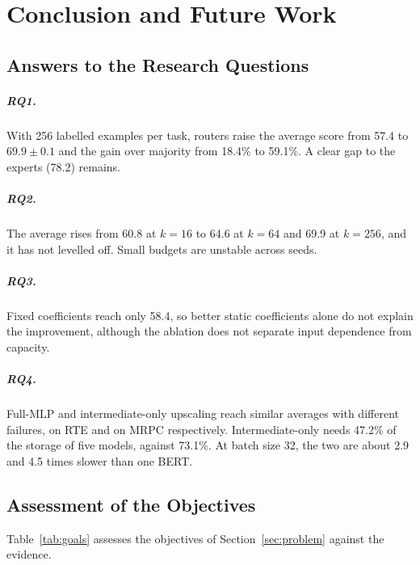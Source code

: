 \chapter{Conclusion and Future Work}
\label{ch:conclusion}

\section{Answers to the Research Questions}

\paragraph{RQ1.} With 256 labelled examples per task, routers raise the average score from 57.4 to $69.9\pm0.1$ and the gain over majority from 18.4\% to 59.1\%. A clear gap to the experts (78.2) remains.

\paragraph{RQ2.} The average rises from 60.8 at $k=16$ to 64.6 at $k=64$ and 69.9 at $k=256$, and it has not levelled off. Small budgets are unstable across seeds.

\paragraph{RQ3.} Fixed coefficients reach only 58.4, so better static coefficients alone do not explain the improvement, although the ablation does not separate input dependence from capacity.

\paragraph{RQ4.} Full-MLP and intermediate-only upscaling reach similar averages with different failures, on RTE and on MRPC respectively. Intermediate-only needs 47.2\% of the storage of five models, against 73.1\%. At batch size 32, the two are about 2.9 and 4.5 times slower than one BERT.

\section{Assessment of the Objectives}

Table~\ref{tab:goals} assesses the objectives of Section~\ref{sec:problem} against the evidence.

